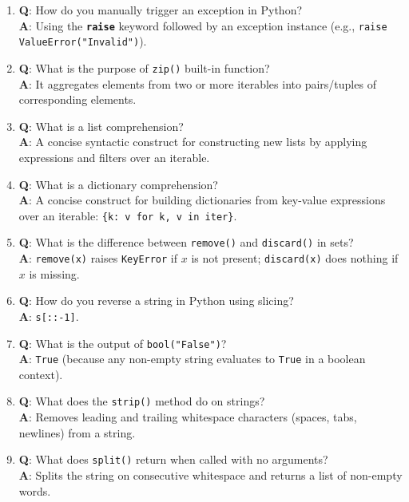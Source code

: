 \begin{enumerate}[leftmargin=1.5em]
    \item \textbf{Q}: How do you manually trigger an exception in Python?\\
    \textbf{A}: Using the \textbf{\texttt{raise}} keyword followed by an exception instance (e.g., \texttt{raise ValueError("Invalid")}).

    \item \textbf{Q}: What is the purpose of \texttt{zip()} built-in function?\\
    \textbf{A}: It aggregates elements from two or more iterables into pairs/tuples of corresponding elements.

    \item \textbf{Q}: What is a list comprehension?\\
    \textbf{A}: A concise syntactic construct for constructing new lists by applying expressions and filters over an iterable.

    \item \textbf{Q}: What is a dictionary comprehension?\\
    \textbf{A}: A concise construct for building dictionaries from key-value expressions over an iterable: \texttt{\{k: v for k, v in iter\}}.

    \item \textbf{Q}: What is the difference between \texttt{remove()} and \texttt{discard()} in sets?\\
    \textbf{A}: \texttt{remove(x)} raises \texttt{KeyError} if $x$ is not present; \texttt{discard(x)} does nothing if $x$ is missing.

    \item \textbf{Q}: How do you reverse a string in Python using slicing?\\
    \textbf{A}: \texttt{s[::-1]}.

    \item \textbf{Q}: What is the output of \texttt{bool("False")}?\\
    \textbf{A}: \texttt{True} (because any non-empty string evaluates to \texttt{True} in a boolean context).

    \item \textbf{Q}: What does the \texttt{strip()} method do on strings?\\
    \textbf{A}: Removes leading and trailing whitespace characters (spaces, tabs, newlines) from a string.

    \item \textbf{Q}: What does \texttt{split()} return when called with no arguments?\\
    \textbf{A}: Splits the string on consecutive whitespace and returns a list of non-empty words.


\end{enumerate}
